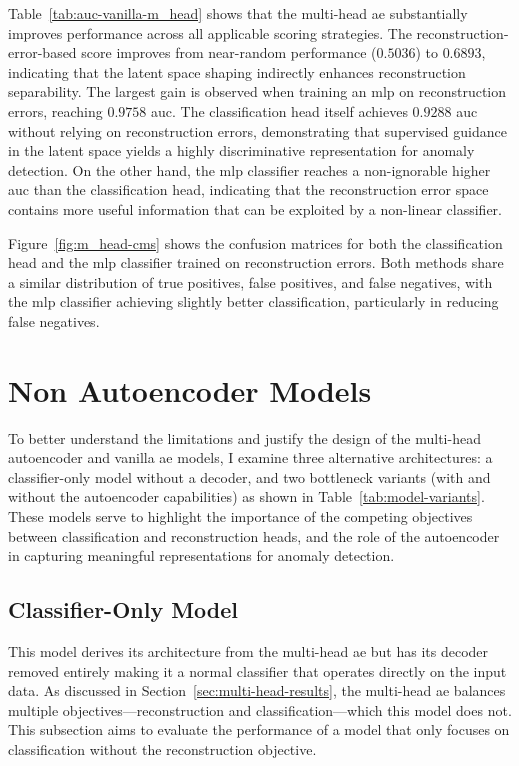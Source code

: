 Table~\ref{tab:auc-vanilla-m_head} shows that the multi-head \gls{ae} substantially improves performance across all applicable scoring strategies.
The reconstruction-error-based score improves from near-random performance ($0.5036$) to $0.6893$, indicating that the latent space shaping indirectly enhances reconstruction separability.
The largest gain is observed when training an \gls{mlp} on reconstruction errors, reaching $0.9758$ \gls{auc}.
The classification head itself achieves $0.9288$ \gls{auc} without relying on reconstruction errors, demonstrating that supervised guidance in the latent space yields a highly discriminative representation for anomaly detection.
On the other hand, the \gls{mlp} classifier reaches a non-ignorable higher \gls{auc} than the classification head, indicating that the reconstruction error space contains more useful information that can be exploited by a non-linear classifier.

Figure~\ref{fig:m_head-cms} shows the confusion matrices for both the classification head and the \gls{mlp} classifier trained on reconstruction errors. 
Both methods share a similar distribution of true positives, false positives, and false negatives, 
with the \gls{mlp} classifier achieving slightly better classification, particularly in reducing false negatives.


\section{Non Autoencoder Models}
\label{sec:not-ae-models}
To better understand the limitations and justify the design of the multi-head autoencoder and vanilla \gls{ae} models, I examine three alternative architectures: a classifier-only model without a decoder, and two bottleneck variants (with and without the autoencoder capabilities) as shown in Table~\ref{tab:model-variants}.
These models serve to highlight the importance of the competing objectives between classification and reconstruction heads, and the role of the autoencoder in capturing meaningful representations for anomaly detection.


\subsection{Classifier-Only Model}
This model derives its architecture from the multi-head \gls{ae} but has its decoder removed entirely making it a normal classifier that operates directly on the input data.
As discussed in Section~\ref{sec:multi-head-results}, the multi-head \gls{ae} balances multiple objectives—reconstruction and classification—which this model does not.
This subsection aims to evaluate the performance of a model that only focuses on classification without the reconstruction objective.


